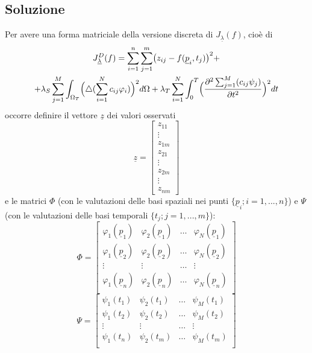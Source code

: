 \documentclass[a4paper,11pt,twoside,openright]{book}							%
\begin{document}
\subsection*{Soluzione}
Per avere una forma matriciale della versione discreta di $J_{\underline \lambda }(f)$, cioè di 
\begin{multline*}
J_{\underline \lambda }^D(f)= \sum_{i=1}^n \sum_{j=1}^m \bigl( z_{ij} - f(\underline p_i,t_j) \bigr)^2 + \\
+ \lambda_S  \sum_{j=1}^M \int_{\Omega_T} \Bigl( \triangle(\sum_{i=1}^N  c_{ij}\varphi_i ) \Bigr)^2 d \Omega + \lambda_T \sum_{i=1}^N\int_0^T \Bigl( \frac{\partial^2 \sum_{j=1}^M(c_{ij}\psi_j) }{\partial t ^2} \Bigr)^2 dt
\end{multline*}
 occorre definire il vettore $\underline z$ dei valori osservati 
\begin{equation}
\underline z =
\begin{bmatrix}
z_{11}  \\
\vdots\\
z_{1m}  \\
z_{21}  \\
\vdots\\
z_{2m}  \\
\vdots\\
z_{nm}
\end{bmatrix}
\end{equation}
e le matrici $\Phi$ (con le valutazioni delle basi spaziali nei punti $\{\underline p_i; i = 1,...,n\}$) e $\Psi$ (con le valutazioni delle basi temporali $\{t_j; j = 1,...,m\}$):
$$
\Phi =
\begin{bmatrix}
\varphi_{1}(\underline p_1) & \varphi_{2}(\underline p_1) & \hdots & \varphi_{N}(\underline p_1)  \\
\varphi_{1}(\underline p_2) & \varphi_{2}(\underline p_2) & \hdots & \varphi_{N}(\underline p_2)  \\
\vdots & \vdots & \hdots & \vdots \\
\varphi_{1}(\underline p_n) & \varphi_{2}(\underline p_n) & \hdots & \varphi_{N}(\underline p_n)  \\
\end{bmatrix}
$$
$$
\Psi = 
\begin{bmatrix}
\psi_{1}( t_1) & \psi_{2}( t_1) & \hdots & \psi_{M}( t_1)  \\
\psi_{1}( t_2) & \psi_{2}( t_2) & \hdots & \psi_{M}( t_2)  \\
\vdots & \vdots & \hdots & \vdots \\
\psi_{1}( t_n) & \psi_{2}( t_m) & \hdots & \psi_{M}( t_m)  \\
\end{bmatrix}
$$
\end{document}
